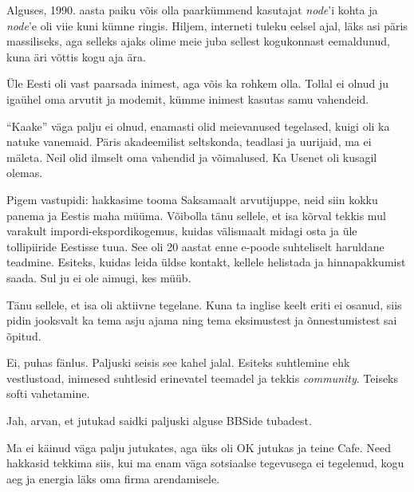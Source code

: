 Alguses, 1990. aasta paiku võis olla paarkümmend 
kasutajat \emph{node}'i kohta ja \emph{node}'e oli viie kuni kümne 
ringis. Hiljem, interneti tuleku eelsel ajal, läks asi päris 
massiliseks, aga selleks ajaks olime meie juba sellest kogukonnast eemaldunud, kuna äri võttis kogu aja ära. 

Üle Eesti oli vast paarsada inimest, aga võis ka rohkem olla. Tollal ei olnud ju igaühel oma arvutit ja modemit, kümme inimest kasutas samu vahendeid. 


\enquote{Kaake} väga palju ei olnud, enamasti olid meievanused tegelased, kuigi oli ka natuke vanemaid. 
Päris akadeemilist seltskonda, 
teadlasi ja uurijaid, ma ei mäleta. Neil olid ilmselt oma vahendid ja 
võimalused. Ka Usenet oli kusagil olemas.


Pigem vastupidi: hakkasime tooma Saksamaalt arvutijuppe, neid siin kokku 
panema ja Eestis maha müüma. Võibolla tänu sellele, et isa kõrval 
tekkis mul varakult impordi-ekspordikogemus, kuidas välismaalt midagi osta ja üle tollipiiride Eestisse tuua. See oli 20 aastat enne e-poode suhteliselt 
haruldane teadmine. Esiteks, kuidas leida üldse kontakt, kellele helistada ja 
hinnapakkumist saada. Sul ju ei ole aimugi, kes müüb.


Tänu sellele, et isa oli aktiivne tegelane. Kuna ta inglise keelt 
eriti ei osanud, siis pidin jooksvalt ka tema asju ajama ning tema 
eksimustest ja õnnestumistest sai õpitud. 


Ei, puhas fänlus. Paljuski seisis see kahel jalal. Esiteks suhtlemine 
ehk vestlustoad, inimesed suhtlesid erinevatel teemadel ja tekkis 
\emph{community}. Teiseks softi vahetamine.


Jah, arvan, et jutukad saidki paljuski alguse BBSide 
tubadest.


Ma ei käinud väga palju jutukates, aga üks oli OK jutukas
ja teine Cafe. Need hakkasid tekkima siis, kui 
ma enam väga sotsiaalse tegevusega ei tegelenud, kogu aeg ja energia 
läks oma firma arendamisele.

